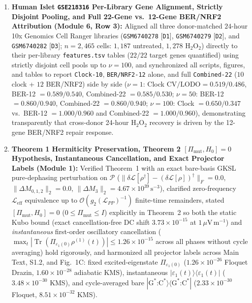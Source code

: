 \documentclass[10pt,letterpaper]{article}
\newcommand{\Lcal}{\mathcal{L}}
\newcommand{\Pcal}{\mathcal{P}}
\newcommand{\Tr}{\operatorname{Tr}}
\begin{document}
\begin{enumerate}[leftmargin=1.8em,itemsep=3pt]
    \item \textbf{Human Islet \texttt{GSE218316} Per-Library Gene Alignment, Strictly Disjoint Pooling, and Full 22-Gene vs.\ 12-Gene BER/NRF2 Attribution (Module 6, Row 3):} Aligned all three donor-matched $24$-hour 10x Genomics Cell Ranger libraries (\texttt{GSM6740278} [\texttt{D1}], \texttt{GSM6740279} [\texttt{D2}], and \texttt{GSM6740282} [\texttt{D3}]; $n = 2{,}465$ cells: $1{,}187$ untreated, $1{,}278$ $\mathrm{H_2O_2}$) directly to their per-library \texttt{features.tsv} tables ($22/22$ target genes quantified) using strictly disjoint cell pools up to $\nu = 100$, and synchronized all scripts, figures, and tables to report \texttt{Clock-10}, \texttt{BER/NRF2-12} alone, and full \texttt{Combined-22} ($10$ clock + $12$ BER/NRF2) side by side ($\nu=1$: Clock $\mathrm{CV}/\mathrm{LODO}=0.519/0.486$, BER-12 $=0.589/0.540$, Combined-22 $=0.585/0.530$; $\nu=50$: BER-12 $=0.860/0.940$, Combined-22 $=0.860/0.940$; $\nu=100$: Clock $=0.650/0.347$ vs.\ BER-12 $=1.000/0.960$ and Combined-22 $=1.000/0.960$), demonstrating transparently that cross-donor 24-hour $\mathrm{H_2O_2}$ recovery is driven by the 12-gene BER/NRF2 repair response.
    \item \textbf{Theorem 1 Hermiticity Preservation, Theorem 2 $[\Pi_{\mathrm{mut}}, H_0] = 0$ Hypothesis, Instantaneous Cancellation, and Exact Projector Labels (Module 1):} Verified Theorem~1 with an exact bare-basis GKSL pure-dephasing perturbation on $\Pcal$ ($\|\delta\Lcal[\rho^\dagger] - (\delta\Lcal[\rho])^\dagger\|_F = 0.0$, $\|\Delta M_{0,1,2}\|_2 = 0.0$, $\|\Delta M_3\|_2 = 4.67 \times 10^{39}\,\mathrm{s}^{-3}$), clarified zero-frequency $\Lcal_{\mathrm{eff}}$ equivalence up to $\mathcal{O}(g_2(\Lcal_{PP})^{-1})$ finite-time remainders, stated $[\Pi_{\mathrm{mut}}, H_0] = 0$ ($0 \le \Pi_{\mathrm{mut}} \le I$) explicitly in Theorem~2 so both the static Kubo bound (exact cancellation-free DC shift $3.73 \times 10^{-15}$ at $1\,\mu\mathrm{V\,m^{-1}}$) and \emph{instantaneous} first-order oscillatory cancellation ($\max_t |\Tr(\Pi_{\varepsilon_1(0)}\rho^{(1)}(t))| \le 1.26 \times 10^{-15}$ across all phases without cycle averaging) hold rigorously, and harmonized all projector labels across Main Text, S1.2, and Fig.~1C: fixed excited-eigenstate $\Pi_{\varepsilon_1(0)}$ ($1.26 \times 10^{-26}$ Floquet Drazin, $1.60 \times 10^{-28}$ adiabatic KMS), instantaneous $|\varepsilon_1(t)\rangle\langle\varepsilon_1(t)|$ ($3.48 \times 10^{-30}$ KMS), and cycle-averaged bare $|\mathrm{G}^*\text{:}\mathrm{C}^*\rangle\langle\mathrm{G}^*\text{:}\mathrm{C}^*|$ ($2.33 \times 10^{-30}$ Floquet, $8.51 \times 10^{-32}$ KMS).

\end{enumerate}
\end{document}
